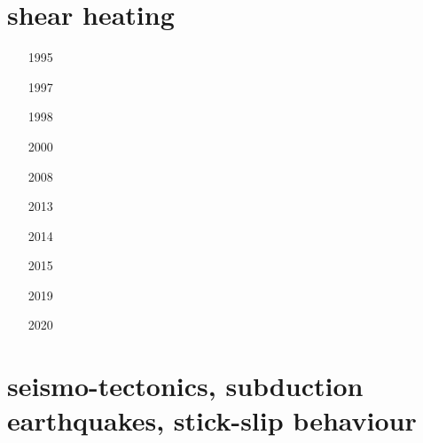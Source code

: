 \section{shear heating}

\begin{small}
\begin{itemize}
\item[1995] 
\item[1997] 
\item[1998] 
\item[2000] 
\item[2008] \\ 
\item[2013] \\ 
\item[2014] 
\item[2015] 
\item[2019] 
\item[2020] 
\end{itemize}
\end{small}

\section{seismo-tectonics, subduction earthquakes, stick-slip behaviour}

